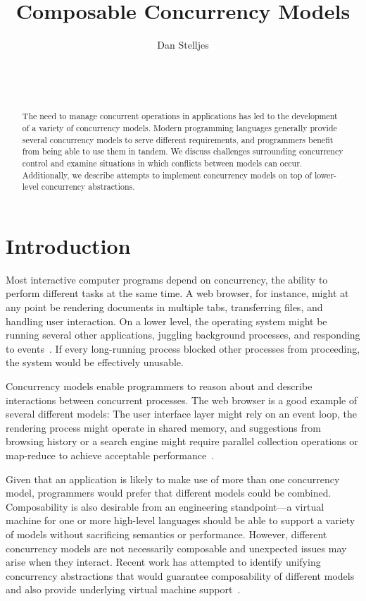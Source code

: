 \documentclass{sig-alternate}
\author{
\alignauthor{}
Dan Stelljes\\
  \affaddr{Division of Science and Mathematics}\\
  \affaddr{University of Minnesota, Morris}\\
  \affaddr{Morris, Minnesota, USA 56267}\\
  \email{stell124@morris.umn.edu}
}
\title{Composable Concurrency Models}
\begin{document}
\maketitle

\begin{abstract}

The need to manage concurrent operations in applications has led to the development of a variety of concurrency models. Modern programming languages generally provide several concurrency models to serve different requirements, and programmers benefit from being able to use them in tandem. We discuss challenges surrounding concurrency control and examine situations in which conflicts between models can occur. Additionally, we describe attempts to implement concurrency models on top of lower-level concurrency abstractions.

\end{abstract}


\section{Introduction}

Most interactive computer programs depend on concurrency, the ability to perform different tasks at the same time. A web browser, for instance, might at any point be rendering documents in multiple tabs, transferring files, and handling user interaction. On a lower level, the operating system might be running several other applications, juggling background processes, and responding to events~\cite{Swalens2014}. If every long-running process blocked other processes from proceeding, the system would be effectively unusable.

Concurrency models enable programmers to reason about and describe interactions between concurrent processes. The web browser is a good example of several different models: The user interface layer might rely on an event loop, the rendering process might operate in shared memory, and suggestions from browsing history or a search engine might require parallel collection operations or map-reduce to achieve acceptable performance~\cite{Marr2012}.

Given that an application is likely to make use of more than one concurrency model, programmers would prefer that different models could be combined. Composability is also desirable from an engineering standpoint---a virtual machine for one or more high-level languages should be able to support a variety of models without sacrificing semantics or performance. However, different concurrency models are not necessarily composable and unexpected issues may arise when they interact. Recent work has attempted to identify unifying concurrency abstractions that would guarantee composability of different models and also provide underlying virtual machine support~\cite{Marr2009, Marr2012, Swalens2014, Ziv2015}.
\end{document}
